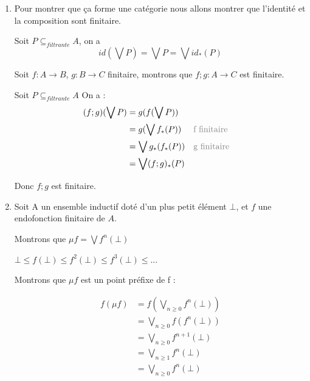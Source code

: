 \documentclass[12pt]{article}
\begin{document}
\begin{enumerate}
    Par définition de $f_*$, on a $x_1, x_2 \in P$ tq :
    \begin{align*}
    y_1 = f(x_1) \leq f(x_3)\\
    y_2 = f(x_2) \leq f(x_3)
\end{align*}

    On conclut en choisissant $y_3 := f(x_3)$,


    De plus $P$ est non vide, donc $f_*(P)$ est non-vide, donc $f_*(P)$ est filtrante.

\item Pour montrer que ça forme une catégorie nous allons montrer que l'identité et la composition sont finitaire.

    Soit $P \subseteq_{filtrante} A$, on a  
    \[
        id(\bigvee P) = \bigvee P = \bigvee id_* (P)
    \]

    Soit $f : A \rightarrow B$, $g : B\rightarrow C$ finitaire, montrons que $f;g : A \rightarrow C$ est finitaire. 

    Soit $P \subseteq_{filtrante} A$ On a :
    \begin{align*}
        (f;g)(\bigvee P) &= g(f(\bigvee P))\\ 
                         &= g(\bigvee f_*(P)) && \textcolor{gray}{\text{f finitaire}} \\ 
                         &= \bigvee g_* (f_*(P)) && \textcolor{gray}{\text{g finitaire}} \\ 
                         &= \bigvee (f;g)_* (P)
    \end{align*}

    Donc $f;g$ est finitaire. 

\item
    Soit A un ensemble inductif doté d'un plus petit élément $\bot$, et $f$ une endofonction finitaire de $A$. 

    Montrons que $\mu f = \bigvee f^n (\bot)$

    $\bot \leq f(\bot) \leq f^2 (\bot) \leq f^3(\bot) \leq ...$

    Montrons que $\mu f$ est un point préfixe de f : 

    \begin{align*}
        f(\mu f) &= f(\bigvee_{n \geq 0} f^n (\bot)) \\ 
                 &= \bigvee_{n\geq 0} f(f^n(\bot)) \\ 
                 &= \bigvee_{n \geq 0} f^{n+1}(\bot)\\ 
                 &= \bigvee_{n \geq 1} f^n(\bot) \\ 
                 &= \bigvee_{n \geq 0} f^n(\bot)
    \end{align*}


\end{enumerate}
\end{document}

